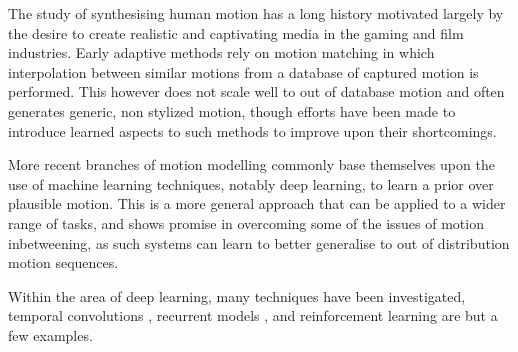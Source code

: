 The study of synthesising human motion has a long history motivated largely by the desire to create realistic and captivating media in the gaming and film industries. Early adaptive methods rely on motion matching \cite{early_motion_matching} \cite{clavet_motion_matching} in which interpolation between similar motions from a database of captured motion is performed. This however does not scale well to out of database motion and often generates generic, non stylized motion, though efforts have been made to introduce learned aspects to such methods \cite{holden_motion_matching} to improve upon their shortcomings.


More recent branches of motion modelling commonly base themselves upon the use of machine learning techniques, notably deep learning, to learn a prior over plausible motion. This is a more general approach that can be applied to a wider range of tasks, and shows promise in overcoming some of the issues of motion inbetweening, as such systems can learn to better generalise to out of distribution motion sequences.

Within the area of deep learning, many techniques have been investigated, temporal convolutions \cite{temporal_convolutions}, recurrent models \cite{recurrent_harvey_2020}, and reinforcement learning \cite{rl_cho} are but a few examples.
